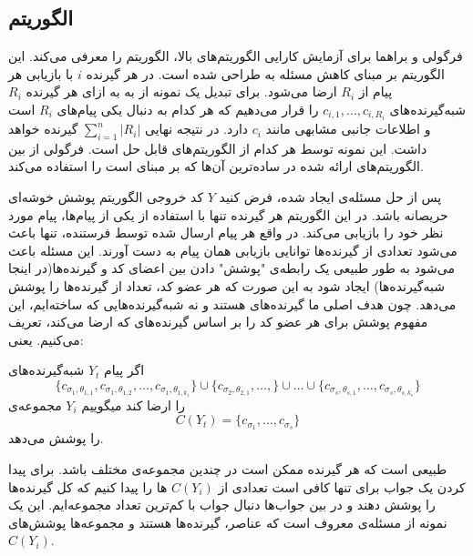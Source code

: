  \subsection{الگوریتم }
 فرگولی و براهما برای آزمایش کارایی الگوریتم‌های بالا، الگوریتم
 را معرفی می‌کند. این الگوریتم بر مبنای کاهش مسئله به
 \icod
 طراحی شده است. در 
 \picod
 هر گیرنده 
 $i$
 با بازیابی هر پیام از
 $R_i$
 ارضا می‌شود. برای تبدیل یک نمونه از
 \picod
 به
 \icod
 به ازای هر گیرنده
 $R_i$
 شبه‌گیرنده‌های
 $c_{i, 1}, \ldots, c_{i, {R_i}}$
 را قرار می‌دهیم که هر کدام به دنبال یکی پیام‌های
 $R_i$
 است و اطلاعات جانبی مشابهی مانند
 $c_i$
 دارد. در نتیجه 
 \icod
 نهایی 
 $\sum\limits_{i = 1}^{n} |R_i|$
 گیرنده خواهد داشت. این نمونه توسط هر کدام از الگوریتم‌های
 \icod
 قابل حل است. فرگولی از بین الگوریتم‌های ارائه شده در
 \cite{25}
 ساده‌ترین آن‌ها که بر مبنای
 است را استفاده می‌کند.
 
 پس از حل مسئله‌ی
 \icod
 ایجاد شده، فرض کنید 
 $Y$
 کد خروجی الگوریتم پوشش خوشه‌ای حریصانه باشد. در این الگوریتم هر گیرنده تنها با استفاده از یکی از پیام‌ها، پیام مورد نظر خود را بازیابی می‌کند. در واقع هر پیام ارسال شده توسط فرستنده، تنها باعث می‌شود تعدادی از گیرنده‌ها توانایی بازیابی همان پیام به دست آورند. این مسئله باعث می‌شود به طور طبیعی یک رابطه‌ی "پوشش" دادن بین اعضای کد و گیرنده‌ها(در اینجا شبه‌گیرنده‌ها) ایجاد شود به این صورت که هر عضو کد، تعداد از گیرنده‌ها را پوشش می‌دهد. چون هدف اصلی ما گیرنده‌های
 \picod
 هستند و نه شبه‌گیرنده‌هایی که ساخته‌ایم، این مفهوم پوشش برای هر عضو کد را بر اساس گیرنده‌های \picod که ارضا می‌کند، تعریف می‌کنیم. یعنی:

 \begin{definition}
 اگر پیام
 $Y_t$
 شبه‌گیرنده‌های
 $$\big\{c_{\sigma_1, \theta_{1, 1}}, c_{\sigma_1, \theta_{1, 2}},\ldots, c_{\sigma_1, \theta_{1, k_1}}\big\} \cup \big\{c_{\sigma_2, \theta_{2, 1}}, \ldots, \big\} \cup \ldots \cup \big\{c_{\sigma_s, \theta_{s, 1}}, \ldots, c_{\sigma_s, \theta_{s, k_s}}\big\}$$
 را ارضا کند میگوییم $Y_i$ مجموعه‌ی
 $$C(Y_t) =\{ c_{\sigma_1}, \ldots, c_{\sigma_s}\}$$
 را پوشش می‌دهد.
\end{definition}
 طبیعی است که هر گیرنده ممکن است در چندین مجموعه‌ی مختلف باشد. برای پیدا کردن یک جواب برای
 \picod
 تنها کافی است تعدادی از 
 $C(Y_i)$
 ها را پیدا کنیم که کل گیرنده‌ها را پوشش دهند و در بین جواب‌ها دنبال جواب با کم‌ترین تعداد مجموعه‌‌ایم. این یک نمونه از مسئله‌ی معروف
 است که عناصر، گیرنده‌ها هستند و مجموعه‌ها پوشش‌های
 $C(Y_i)$.
 
